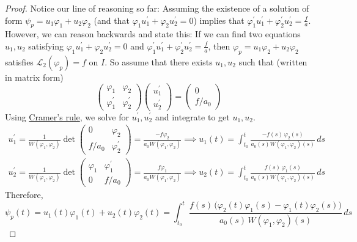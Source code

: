 \documentclass{article}
\begin{document}
\begin{proof}
      Notice our line of reasoning so far: Assuming the existence of a solution of form $\psi_p = u_1 \varphi_1 + u_2 \varphi_2$ (and that $\varphi_1 u_1^\prime + \varphi_2 u_2^\prime = 0$) implies that $\varphi_1^\prime u_1^\prime + \varphi_2^\prime u_2^\prime = \frac{f}{a}$. However, we can reason backwards and state this: If we can find two equations $u_1, u_2$ satisfying $\varphi_1 u_1^\prime + \varphi_2 u_2^\prime = 0$ and $\varphi_1^\prime u_1^\prime + \varphi_2^\prime u_2^\prime = \frac{f}{a}$, then $\varphi_p = u_1 \varphi_2 + u_2 \varphi_2$ satisfies $\mathcal{L}_2 (\varphi_p) = f$ on $I$. So assume that there exists $u_1, u_2$ such that (written in matrix form)
      \begin{equation}
        \begin{pmatrix}
              \varphi_1 & \varphi_2 \\
              \varphi_1^\prime & \varphi_2^\prime
              \end{pmatrix} \begin{pmatrix}
              u_1^\prime \\u_2^\prime
              \end{pmatrix} = \begin{pmatrix}
              0 \\ f / a_0
              \end{pmatrix}
      \end{equation}
      Using \hyperref[lin-thm:cramers-rule]{Cramer's rule}, we solve for $u_1^\prime, u_2^\prime$ and integrate to get $u_1, u_2$. 
      \begin{align*}
          u_1^\prime = \frac{1}{W(\varphi_1, \varphi_2)} \det{\begin{pmatrix} 0 & \varphi_2 \\ f / a_0 & \varphi_2^\prime
          \end{pmatrix}} = \frac{-f \varphi_2}{a_0 W(\varphi_1, \varphi_2)} \implies u_1 (t) = \int_{t_0}^t \frac{-f(s)\,\varphi_2 (s)}{ a_0 (s) W(\varphi_1, \varphi_2) (s)}\,ds \\
          u_2^\prime = \frac{1}{W(\varphi_1, \varphi_2)} \det{\begin{pmatrix} \varphi_1 & \varphi_1^\prime \\ 0 & f / a_0
          \end{pmatrix}} = \frac{f \varphi_1}{a_0 W(\varphi_1, \varphi_2)} \implies u_2 (t) = \int_{t_0}^t \frac{f(s)\,\varphi_1 (s)}{ a_0 (s) W(\varphi_1, \varphi_2) (s)}\,ds
      \end{align*}
      Therefore, 
      \begin{equation}
        \psi_p (t) = u_1 (t) \varphi_1 (t) + u_2 (t) \varphi_2 (t) = \int_{t_0}^t \frac{f(s) \, \big( \varphi_2 (t) \varphi_1 (s) - \varphi_1(t) \varphi_2 (s)\big)}{a_0 (s) \, W(\varphi_1, \varphi_2) (s)}\,ds
      \end{equation}
      \end{proof}
\end{document}
